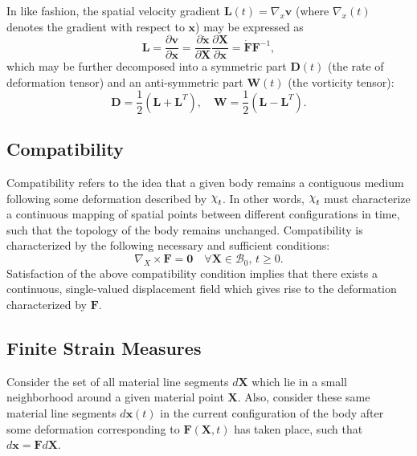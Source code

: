 In like fashion, the spatial velocity gradient $\mathbf{L} (t) = \nabla_x \mathbf{v}$ (where $\nabla_x(t)$ denotes the gradient with respect to $\mathbf{x}$) may be expressed as
\begin{equation}
  \mathbf{L} = \frac{\partial \mathbf{v}}{\partial \mathbf{x}} = \frac{\partial \dot{\mathbf{x}}}{\partial \mathbf{X}} \frac{\partial \mathbf{X}}{\partial \mathbf{x}} = \dot{\mathbf{F}} \mathbf{F}^{-1},
\end{equation}
which may be further decomposed into a symmetric part $\mathbf{D}(t)$ (the rate of deformation tensor) and an anti-symmetric part $\mathbf{W}(t)$ (the vorticity tensor):
\begin{equation}
  \mathbf{D} = \frac{1}{2} (\mathbf{L} + \mathbf{L}^T), \quad \mathbf{W} = \frac{1}{2} (\mathbf{L} - \mathbf{L}^T).
\end{equation}

\subsection*{Compatibility}

Compatibility refers to the idea that a given body remains a contiguous medium following some deformation described by $\raisebox{\depth}{$\chi$}_t$. In other words, $\raisebox{\depth}{$\chi$}_t$ must characterize a continuous mapping of spatial points between different configurations in time, such that the topology of the body remains unchanged. Compatibility is characterized by the following necessary and sufficient conditions:
\begin{equation}
  \nabla_X \times \mathbf{F} = \mathbf{0} \quad \forall \mathbf{X} \in \mathcal{B}_0, \, t \geq 0.
  \label{eq:compatibility}
\end{equation}
Satisfaction of the above compatibility condition implies that there exists a continuous, single-valued displacement field which gives rise to the deformation characterized by $\mathbf{F}$.

\subsection*{Finite Strain Measures}

Consider the set of all material line segments $d \mathbf{X}$ which lie in a small neighborhood around a given material point $\mathbf{X}$. Also, consider these same material line segments $d \mathbf{x}(t)$ in the current configuration of the body after some deformation corresponding to $\mathbf{F} (\mathbf{X}, t)$ has taken place, such that $d \mathbf{x} = \mathbf{F} d \mathbf{X}$.

